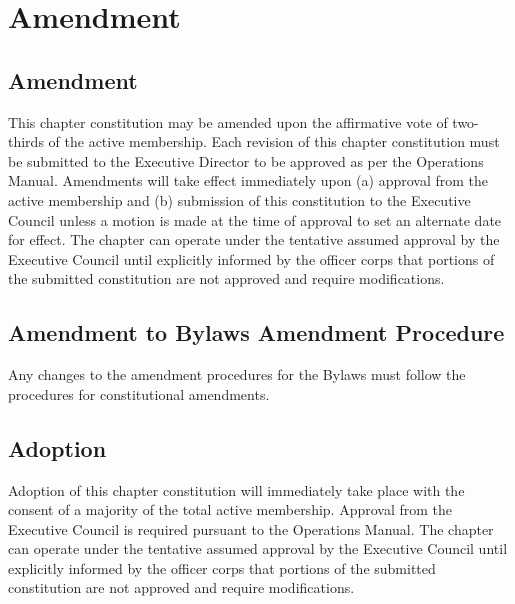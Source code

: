 \chapter{Amendment}
\section{Amendment}
This chapter constitution may be amended upon the affirmative vote of two-thirds of the active membership. Each revision of this chapter constitution must be submitted to the \hkn Executive Director to be approved as per the \hkn Operations Manual. Amendments will take effect immediately upon (a) approval from the active membership and (b) submission of this constitution to the \hkn Executive Council unless a motion is made at the time of approval to set an alternate date for effect. The chapter can operate under the tentative assumed approval by the \hkn Executive Council until explicitly informed by the officer corps that portions of the submitted constitution are not approved and require modifications.

\section{Amendment to Bylaws Amendment Procedure}
Any changes to the amendment procedures for the Bylaws must follow the procedures for constitutional amendments.

\section{Adoption}
Adoption of this chapter constitution will immediately take place with the consent of a majority of the total active membership. Approval from the \hkn Executive Council is required pursuant to the \hkn Operations Manual. The chapter can operate under the tentative assumed approval by the \hkn Executive Council until explicitly informed by the officer corps that portions of the submitted constitution are not approved and require modifications. 